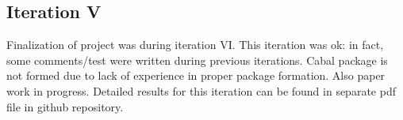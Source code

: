 \subsection{Iteration V}
Finalization of project was during iteration VI. This iteration was ok: in fact, some comments/test were written during previous iterations. Cabal package is not formed due to lack of experience in proper package formation. Also paper work in progress.
Detailed results for this iteration can be found in separate pdf file\cite{khazhix6} in github repository.